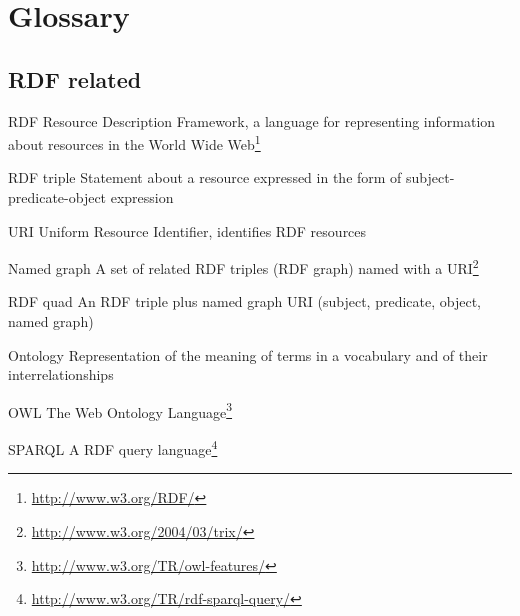 



\appendix

\chapter{Glossary}

\section*{RDF related}
\begin{glossarylist}
	\item[RDF] Resource Description Framework, a language for representing information about resources in the World Wide Web\footnote{\url{http://www.w3.org/RDF/}}
	\item[RDF triple] Statement about a resource expressed in the form of subject-predicate-object expression
	\item[URI] Uniform Resource Identifier, identifies RDF resources
	\item[Named graph] A set of related RDF triples (RDF graph) named with a URI\footnote{\url{http://www.w3.org/2004/03/trix/}}
	\item[RDF quad] An RDF triple plus named graph URI (subject, predicate, object, named graph)
	\item[Ontology] Representation of the meaning of terms in a vocabulary and of their interrelationships
	\item[OWL] The Web Ontology Language\footnote{\url{http://www.w3.org/TR/owl-features/}}
	\item[SPARQL] A RDF query language\footnote{\url{http://www.w3.org/TR/rdf-sparql-query/}}
\end{glossarylist}

